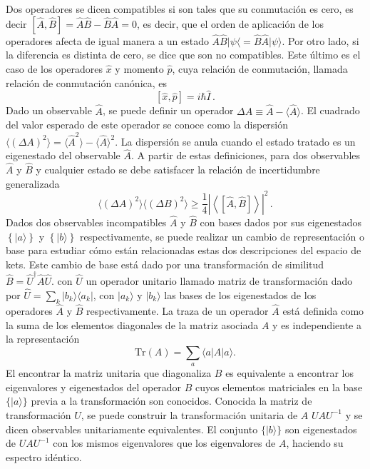 Dos operadores se dicen compatibles si son tales que su conmutación es cero, es decir $[\hat{A}, \hat{B}] = \hat{A}\hat{B} - \hat{B}\hat{A} = 0$, es decir, que el orden de aplicación de los operadores afecta de igual manera a un estado $\hat{A} \hat{B} \vert\psi\langle = \hat{B} \hat{A} \vert \psi \rangle$. Por otro lado, si la diferencia es distinta de cero, se dice que son no compatibles. Este último es el caso de los operadores $\hat{x}$ y momento $\hat{p}$, cuya relación de conmutación, llamada relación de conmutación canónica, es
\begin{equation}
  \label{1.3}
  [\hat{x}, \hat{p}] = i\hbar \hat{I}\,.
\end{equation}
Dado un observable $\hat{A}$, se puede definir un operador $\Delta A \equiv \hat{A} - \langle \hat{A} \rangle$. El cuadrado del valor esperado de este operador se conoce como la dispersión $\langle (\Delta A)^2 \rangle = \langle \hat{A}^2\rangle  - \langle\hat{A}\rangle^2$. La dispersión se anula cuando el estado tratado es un eigenestado del observable $\hat{A}$. A partir de estas definiciones, para dos observables $\hat{A}$ y $\hat{B}$ y cualquier estado se debe satisfacer la relación de incertidumbre generalizada
\begin{equation}
  \label{1.4}
  \langle (\Delta A)^2 \rangle \langle (\Delta B)^2 \rangle \geq \frac{1}{4} \left| \left\langle \left[ \hat{A}, \hat{B} \right] \right\rangle  \right|^2 \,.
\end{equation}
Dados dos observables incompatibles $\hat{A}$ y $\hat{B}$ con bases dados por sus eigenestados $\left\{\vert a \rangle\right\}$ y $\left\{\vert b \rangle\right\}$ respectivamente, se puede realizar un cambio de representación o base para estudiar cómo están relacionadas estas dos descripciones del espacio de kets. Este cambio de base está dado por una transformación de similitud $\hat{B} = \hat{U}^\dagger \hat{A} \hat{U}$. con $\hat{U}$ un operador unitario llamado matriz de transformación dado por $\hat{U} = \sum_k \vert b_k \rangle \langle a_k \vert$, con $\vert a_k\rangle$ y $\vert b_k\rangle $ las bases de los eigenestados de los operadores $\hat{A}$ y $\hat{B}$ respectivamente. La traza de un operador $\hat{A}$ está definida como la suma de los elementos diagonales de la matriz asociada $A$ y es independiente a la representación
\begin{equation}
  \text{Tr}(A) = \sum_a \langle a\vert A\vert a \rangle.
\end{equation}
El encontrar la matriz unitaria que diagonaliza $B$ es equivalente a encontrar los eigenvalores y eigenestados del operador $B$ cuyos elementos matriciales en la base $\{\vert a\rangle\}$ previa a la transformación son conocidos. Conocida la matriz de transformación $U$, se puede construir la transformación unitaria de $A$ $UAU^{-1}$ y se dicen observables unitariamente equivalentes. El conjunto $\{\vert b\rangle\}$ son eigenestados de $UAU^{-1}$ con los mismos eigenvalores que los eigenvalores de $A$, haciendo su espectro idéntico.

